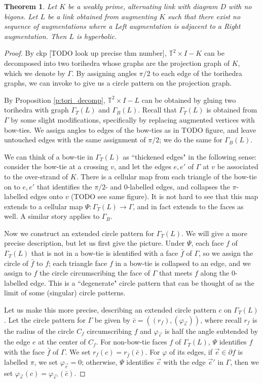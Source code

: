 \documentclass[11pt]{amsart}
\newcommand{\prpref}[1]{Proposition \ref{#1}}
\newcommand{\torus}{{\mathbb{T}^2}}
\newcommand{\del}{\partial}
\newcommand{\vphi}{\varphi}
\newcommand{\toruscomp}[1]{{\torus \times I - #1}}
\theoremstyle{plain}
\newtheorem{theorem}{Theorem}[section]
\theoremstyle{definition}
\begin{document}
\begin{theorem}
Let $K$ be a weakly prime, alternating link with diagram $D$ with no bigons. Let
$L$ be a link obtained from augmenting $K$ such that there exist no sequence of
augmentations where a Left augmentation is adjacent to a Right augmentation.
Then $L$ is hyperbolic.
\end{theorem}


\begin{proof}
By ckp [TODO look up precise thm number],
$\toruscomp{K}$ can be decomposed
into two torihedra whose graphs are the projection graph of $K$,
which we denote by $\Gamma$.
By assigning angles $\pi/2$ to each edge of the torihedra graphs,
we can invoke \cite[Theorem 3]{BandS} to give us a circle pattern
on the projection graph.

By \prpref{p:tori_decomp}, $\toruscomp{L}$ can be
obtained by gluing two torihedra with graph $\Gamma_T(L)$ and $\Gamma_B(L)$.
Recall that $\Gamma_T(L)$ is obtained from $\Gamma$ by some slight
modifications, specifically by replacing augmented vertices with bow-ties.
We assign angles to edges of the bow-ties as in TODO figure,
and leave untouched edges with the same assignment of $\pi/2$;
we do the same for $\Gamma_B(L)$.


We can think of a bow-tie in $\Gamma_T(L)$ as ``thickened edges" in the
following sense: consider the bow-tie at a crossing $v$,
and let the edges $e,e'$ of $\Gamma$ at $v$
be associated to the over-strand of $K$.
There is a cellular map from each triangle of the bow-tie
on to $e, e'$ that identifies the $\pi/2$- and 0-labelled edges,
and collapses the $\pi$-labelled edges onto $v$
(TODO see same figure).
It is not hard to see that this map extends to a cellular map
$\Psi: \Gamma_T(L) \to \Gamma$,
and in fact extends to the faces as well.
A similar story applies to $\Gamma_B$.


Now we construct an extended circle pattern for $\Gamma_T(L)$.
We will give a more precise description,
but let us first give the picture.
Under $\Psi$,
each face $f$ of $\Gamma_T(L)$ that is not in a bow-tie
is identified with a face $\bar{f}$ of $\Gamma$,
so we assign the circle of $\bar{f}$ to $f$;
each triangle face $f$ in a bow-tie is collapsed to an edge,
and we assign to $f$ the circle circumscribing the
face of $\Gamma$ that meets $f$ along the 0-labelled edge.
This is a ``degenerate" circle pattern that can be thought of as
the limit of some (singular) circle patterns.


Let us make this more precise,
describing an extended circle pattern $c$
on $\Gamma_T(L)$.
Let the circle pattern for $\Gamma$ be given by
$\bar{c} = ((r_f),(\vphi_{\vec{e}}))$,
where recall $r_f$ is the radius of the circle $C_f$
circumscribing $f$ and $\vphi_{\vec{e}}$
is half the angle subtended by the edge $e$
at the center of $C_f$.
For non-bow-tie faces $f$ of $\Gamma_T(L)$,
$\Psi$ identifies $f$ with the face $\bar{f}$ of $\Gamma$.
We set $r_f(c) = r_{\bar{f}}(\bar{c})$.
For $\vphi$ of its edges,
if $\vec{e} \in \del f$ is labelled $\pi$,
we set $\vphi_{\vec{e}} = 0$;
otherwise, $\Psi$ identifies $\vec{e}$
with the edge $\vec{e}'$ in $\Gamma$,
then we set $\vphi_{\vec{e}}(c) = \vphi_{\vec{e}'}(\bar{c})$.



\end{proof}
\end{document}
